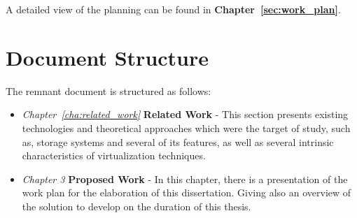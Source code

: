 A detailed view of the planning can be found in \textbf{Chapter~\ref{sec:work_plan}}.



\section{Document Structure} %
\label{sec:document_structure}

The remnant document is structured as follows: 

\begin{itemize}

  \item \textit{Chapter~\ref{cha:related_work}}  \textbf{Related Work} - This section presents existing technologies and theoretical approaches which were the target of study, such as, storage systems and several of its features, as well as several intrinsic characteristics of virtualization techniques.

  \item \textit{Chapter 3} \textbf{Proposed Work} - In this chapter, there is a presentation of the work plan for the elaboration of this dissertation. Giving also an overview of the solution to develop on the duration of this thesis.

\end{itemize}


